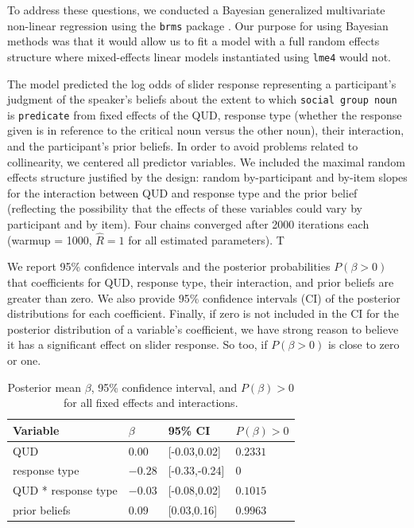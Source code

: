 \documentclass[11pt,a4paper]{article}
\begin{document}
To address these questions, we conducted a Bayesian generalized multivariate non-linear regression using the \texttt{brms} package \cite{buerkner}. Our purpose for using Bayesian methods was that it would allow us to fit a model with a full random effects structure where mixed-effects linear models instantiated using \texttt{lme4} would not. 

The model predicted the log odds of slider response representing a participant's judgment of the speaker's beliefs about the extent to which \texttt{social group noun} is \texttt{predicate} from fixed effects of the QUD, response type (whether the response given is in reference to the critical noun versus the other noun), their interaction, and the participant's prior beliefs. In order to avoid problems related to collinearity, we centered all predictor variables. We included the maximal random effects structure justified by the design: random by-participant and by-item slopes for the interaction between QUD and response type and the prior belief (reflecting the possibility that the effects of these variables could vary by participant and by item). Four chains converged after 2000 iterations each (warmup = 1000, \(\hat{R}=1\) for all estimated parameters). T 

We report 95\% confidence intervals and the posterior probabilities $P(\beta > 0)$ that coefficients for QUD, response type, their interaction, and prior beliefs are greater than zero. We also provide 95\% confidence intervals (CI) of the posterior distributions for each coefficient.  Finally, if zero is not included in the CI for the posterior distribution of a variable's coefficient, we have strong reason to believe it has a significant effect on slider response. So too, if $P(\beta > 0)$ is close to zero or one.

\begin{table}
\centering
\begin{tabular}{llll}
  Variable & $\beta$ & 95\% CI&$P(\beta) > 0$\\
  \hline
  QUD & $0.00$ & {[}-0.03,0.02{]} &$0.2331$\\
  response type & $-0.28$ & {[}-0.33,-0.24{]} &$0$\\
  QUD * response type & $-0.03$ & {[}-0.08,0.02{]} &$0.1015$\\
  prior beliefs & $0.09$ & {[}0.03,0.16{]} &$0.9963$\\
\end{tabular}
\caption{Posterior mean $\beta$, 95\% confidence interval, and $P(\beta) > 0$ for all fixed effects and interactions.
  }
\end{table}
\end{document}
